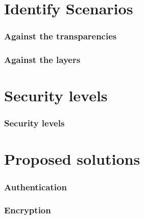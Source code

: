 \documentclass{beamer}
\begin{document}
\section{Identify Scenarios}


\begin{frame}
\frametitle{Against the transparencies}
\end{frame}

\begin{frame}
\frametitle{Against the layers}
\end{frame}

\section{Security levels}

\begin{frame}
\frametitle{Security levels}
\end{frame}

\section{Proposed solutions}


\begin{frame}
\frametitle{Authentication}
\end{frame}

\begin{frame}
\frametitle{Encryption}
\end{frame}
\end{document}

